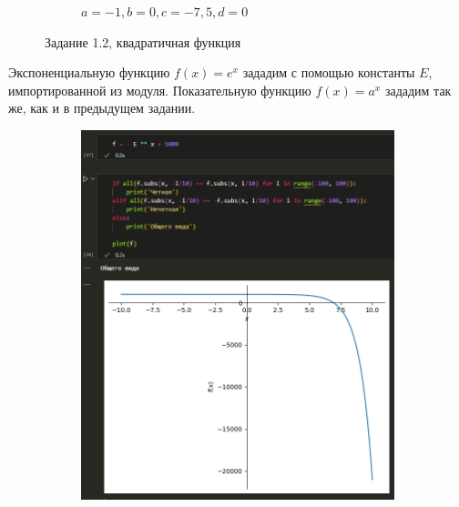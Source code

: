 \documentclass[14pt,a4paper]{extarticle}
\begin{document}
\begin{figure}[h!]
\begin{subfigure}{.5\textwidth}
        \caption{$a=-1,b=0,c=-7,5,d=0$}
        \label{fig:1.2-cb2}
    \end{subfigure}
    \caption{Задание 1.2, квадратичная функция}
    \label{fig:1.2-cb}
\end{figure}

Экспоненциальную функцию $f(x)=e^x$ зададим с помощью константы $E$, импортированной из модуля.
Показательную функцию $f(x)=a ^ x$ зададим так же, как и в предыдущем задании.

\begin{figure}[h!]
    \centering
    \begin{subfigure}{.5\textwidth}
        \centering
        \includegraphics[width=0.9\linewidth]{figures//inftech//lab1/1.2-exp.png}
    \end{subfigure}%
    \begin{subfigure}{.5\textwidth}
        \centering

\end{subfigure}
\end{figure}
\end{document}
